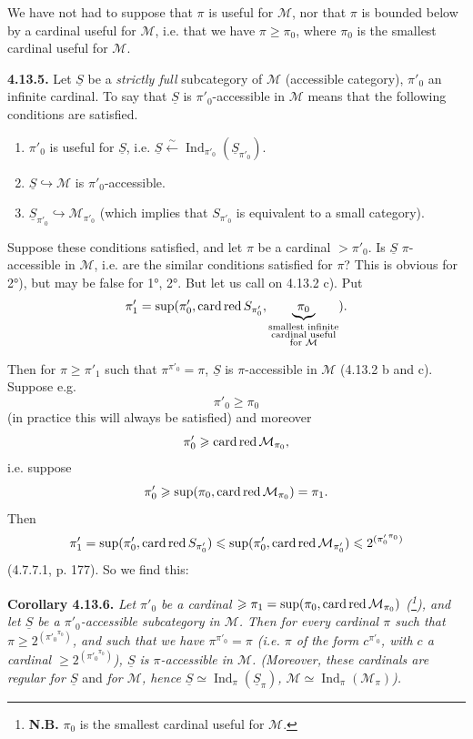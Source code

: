 \documentclass[11pt]{article}
\newcommand{\msp}[1]{\marginpar{\footnotesize [#1]}}
\newcommand{\M}{\mathcal{M}}
\newcommand{\Ind}{\operatorname{Ind}}
\newcommand{\card}{\operatorname{card}}
\newcommand{\red}{\mathop{\textup{red}}\nolimits}
\newcommand{\uS}{\underline{S}}
\begin{document}
We have not had to suppose that $\pi$ is useful for $\M$, nor that $\pi$ is bounded below by a cardinal useful for $\M$, i.e. that we have $\pi \geqslant \pi_0$, where $\pi_0$ is the smallest cardinal useful for $\M$.

\msp{page 289}
\textbf{4.13.5.} Let $\uS$ be a \textit{strictly full} subcategory of $\M$ (accessible category), $\pi'_0$ an infinite cardinal. To say that $\uS$ is $\pi'_0$-accessible in $\M$ means that the following conditions are satisfied.
\begin{enumerate}
\item[1)] $\pi'_0$ is useful for $\uS$, i.e. $\uS \xleftarrow{\sim} \Ind_{\pi'_0}(\uS_{\pi'_0})$.
\item[2)] $\uS \hookrightarrow \M$ is $\pi'_0$-accessible.
\item[3)] $\uS_{\pi'_0} \hookrightarrow \M_{\pi'_0}$ (which implies that $S_{\pi'_0}$ is equivalent to a small category).
\end{enumerate}
Suppose these conditions satisfied, and let $\pi$ be a cardinal $> \pi'_0$. Is $\uS$ $\pi$-accessible in $\M$, i.e. are the similar conditions satisfied for $\pi$? This is obvious for 2°), but may be false for 1°, 2°. But let us call on 4.13.2 c). Put
\[
\pi'_1 = \sup(\pi'_0, \card\red S_{\pi'_0}, \underbrace{\pi_0}_{\substack{\text{smallest infinite}\\ \text{cardinal useful}\\ \text{for } \M}} ) .
\]

\msp{page 290}
Then for $\pi \geqslant \pi'_1$ such that $\pi^{\pi'_0} = \pi$, $\uS$ is $\pi$-accessible in $\M$ (4.13.2 b and c). Suppose e.g.
\[
\pi'_0 \geqslant \pi_0
\]
(in practice this will always be satisfied) and moreover
\[
\pi'_0 \geqslant \card\red\M_{\pi_0} ,
\]
i.e. suppose
\[
\pi'_0 \geqslant \sup(\pi_0, \card\red\M_{\pi_0}) = \pi_1 .
\]
Then
\[
\pi'_1 = \sup(\pi'_0, \card\red S_{\pi'_0}) \leqslant \sup(\pi'_0, \card\red\M_{\pi'_0}) \leqslant 2^{({\pi'_0}^{\pi_0})}
\]
(4.7.7.1, p. 177). So we find this:

\textbf{Corollary 4.13.6.} \textit{Let $\pi'_0$ be a cardinal $\geqslant \pi_1 = \sup(\pi_0, \card\red\M_{\pi_0})$ (\footnote[118]{\textbf{N.B.} $\pi_0$ is the smallest cardinal useful for $\M$.}), and let $\uS$ be a $\pi'_0$-accessible subcategory in $\M$. Then for every cardinal $\pi$ such that $\pi \geqslant 2^{({\pi'_0}^{\pi_0})}$, and such that we have $\pi^{\pi'_0} = \pi$ (i.e. $\pi$ of the form $c^{\pi'_0}$, with $c$ a cardinal $\geqslant 2^{({\pi'_0}^{\pi_0})}$), $\uS$ is $\pi$-accessible in $\M$. (Moreover, these cardinals are regular for $\uS$} and \textit{for $\M$, hence $\uS \simeq \Ind_\pi(\uS_\pi)$, $\M \simeq \Ind_\pi(\M_\pi)$).}
\end{document}
